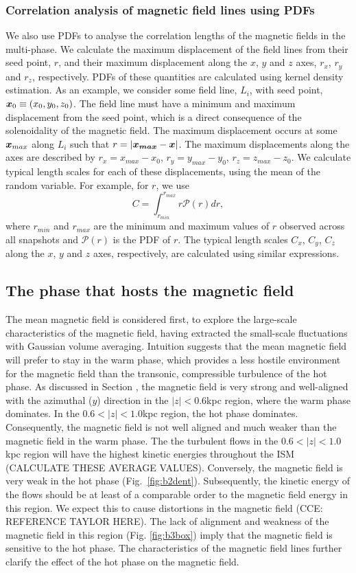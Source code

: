\documentclass[useAMS,usenatbib]{mn2e}
\begin{document}
\subsubsection{Correlation analysis of magnetic field lines using PDFs}
We also use PDFs to analyse the correlation lengths of the magnetic fields in the multi-phase. We calculate the maximum displacement of the field lines from their seed point, $r$, and their maximum displacement along the $x$, $y$ and $z$ axes, $r_x$, $r_y$ and $r_z$, respectively. PDFs of these quantities are calculated using kernel density estimation. As an example, we consider some field line, $L_i$, with seed point, $\boldsymbol{x}_0\equiv(x_0,y_0,z_0)$. The field line must have a minimum and maximum displacement from the seed point, which is a direct consequence of the solenoidality of the magnetic field. The maximum displacement occurs at some $\boldsymbol{x}_{max}$ along $L_i$ such that $r=|\boldsymbol{x_{max}}-\boldsymbol{x}|$. The maximum displacements along the axes are described by $r_x = x_{max}-x_0$, $r_y = y_{max}-y_0$, $r_z = z_{max}-z_0$. We calculate typical length scales for each of these displacements, using the mean of the random variable. For example, for $r$, we use
\begin{equation}
C = \int_{r_{min}}^{r_{max}}r\mathcal{P}(r)dr,
\end{equation}
where $r_{min}$ and $r_{max}$ are the minimum and maximum values of $r$ observed across all snapshots and $\mathcal{P}(r)$ is the PDF of $r$. The typical length scales $C_x$, $C_y$, $C_z$ along the $x$, $y$ and $z$ axes, respectively, are calculated using similar expressions. 
\subsection{The phase that hosts the magnetic field}
The mean magnetic field is considered first, to explore the large-scale characteristics of the magnetic field, having extracted the small-scale fluctuations with Gaussian volume averaging.  Intuition suggests that the mean magnetic field will prefer to stay in the warm phase, which provides a less hostile environment for the magnetic field than the transonic, compressible turbulence of the hot phase. As discussed in Section \label{sect:3BB}, the magnetic field is very strong and well-aligned with the azimuthal ($y$) direction in the $|z|<0.6$kpc region, where the warm phase dominates. In the $0.6<|z|<1.0$kpc region, the hot phase dominates. Consequently, the magnetic field is not well aligned and much weaker than the magnetic field in the warm phase. The the turbulent flows in the $0.6<|z|<1.0$kpc region will have the highest kinetic energies throughout the ISM (CALCULATE THESE AVERAGE VALUES). Conversely, the magnetic field is very weak in the hot phase (Fig.~\ref{fig:b2dent}). Subsequently, the kinetic energy of the flows should be at least of a comparable order to the magnetic field energy in this region.  We expect this to cause distortions in the magnetic field (CCE: REFERENCE TAYLOR HERE). The lack of alignment and weakness of the magnetic field in this region (Fig. \ref{fig:b3box}) imply that the magnetic field is sensitive to the hot phase. The characteristics of the magnetic field lines further clarify the effect of the hot phase on the magnetic field.
\end{document}
